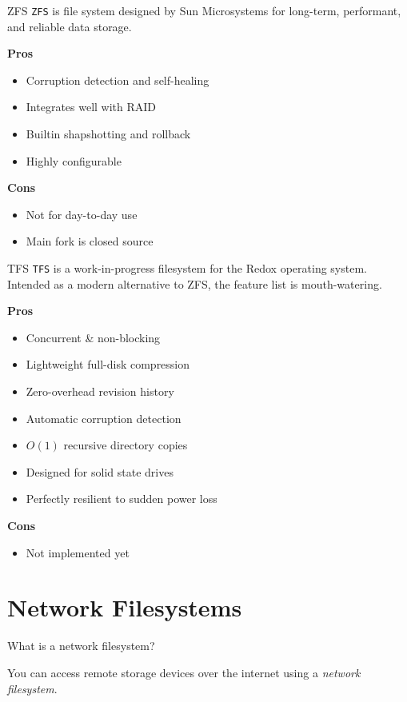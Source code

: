 \documentclass{lug}
\begin{document}
\begin{frame}{ZFS}
\texttt{ZFS} is file system designed by Sun Microsystems for long-term,
performant, and reliable data storage.

\textbf{Pros}\begin{itemize}
    \item Corruption detection and self-healing
    \item Integrates well with RAID
    \item Builtin shapshotting and rollback
    \item Highly configurable
\end{itemize}

\textbf{Cons}\begin{itemize}
    \item Not for day-to-day use
    \item Main fork is closed source
\end{itemize}
\end{frame}

\begin{frame}{TFS}
\texttt{TFS} is a work-in-progress filesystem for the Redox operating system.
Intended as a modern alternative to ZFS, the feature list is mouth-watering.

\textbf{Pros}\begin{itemize}
    \item Concurrent \& non-blocking
    \item Lightweight full-disk compression
    \item Zero-overhead revision history
    \item Automatic corruption detection
    \item $O(1)$ recursive directory copies
    \item Designed for solid state drives
    \item Perfectly resilient to sudden power loss
\end{itemize}

\textbf{Cons}\begin{itemize}
    \item Not implemented yet
\end{itemize}
\end{frame}

\section{Network Filesystems}
\begin{frame}{What is a network filesystem?}
\begin{center}
    You can access remote storage devices over the internet using a
    \emph{network filesystem}.
\end{center}
\end{frame}
\end{document}
